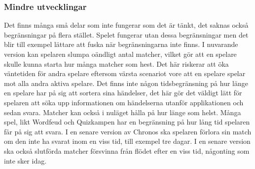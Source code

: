 \documentclass[a4paper, 11pt]{article}
\begin{document}
\subsubsection{Mindre utvecklingar}
Det finns många små delar som inte fungerar som det är tänkt, det saknas också begränsningar på flera stället. Spelet fungerar utan dessa begränsningar men det blir till exempel lättare att fuska när begränsningarna inte finns. I nuvarande version kan spelaren slumpa oändligt antal matcher, vilket gör att en spelare skulle kunna starta hur många matcher som hest. Det här riskerar att öka väntetiden för andra spelare eftersom värsta scenariot vore att en spelare spelar mot alla andra aktiva spelare. Det finns inte någon tidsbegränsning på hur länge en spelare har på sig att sortera sina händelser, det här gör det väldigt lätt för spelaren att söka upp informationen om händelserna utanför applikationen och sedan svara. Matcher kan också i nuläget hålla på hur länge som helst. Många spel, likt Wordfeud och Quizkampen har en begränsning på hur lång tid spelaren får på sig att svara. I en senare version av Chronos ska spelaren förlora sin match om den inte ha svarat inom en viss tid, till exempel tre dagar. I en senare version ska också slutförda matcher försvinna från flödet efter en viss tid, någonting som inte sker idag.

\newpage
{}
\printbibliography[title={Referenser}]
\end{document}
